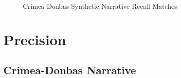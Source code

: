 \documentclass{article}
\begin{document}
\hphantom{em}

\begin{figure}[H]
\caption{ Crimea-Donbas Synthetic Narrative Recall Matches \label{fig:ft_crimea_recall}}
\end{figure}
\clearpage

\hypertarget{precision}{%
\section{Precision}\label{precision}}

\hypertarget{crimea-donbas-narrative}{%
\subsection{Crimea-Donbas Narrative}\label{crimea-donbas-narrative}}
\end{document}
